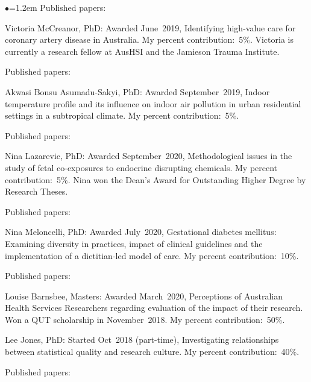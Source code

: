 \documentclass[a4paper,11pt]{article}
\renewcommand{\labelitemi}{$\bullet$}
\begin{document}
\begin{raggedright}
\begin{list}{\labelitemi}{\leftmargin=1.2em}
Published papers: 

\item Victoria McCreanor, PhD: Awarded June~2019, Identifying high-value care for coronary artery disease in Australia. My percent contribution:~5\%. Victoria is currently a research fellow at AusHSI and the Jamieson Trauma Institute.

Published papers: 

\item Akwasi Bonsu Asumadu-Sakyi, PhD: Awarded September~2019, Indoor temperature profile and its influence on indoor air pollution in urban residential settings in a subtropical climate. My percent contribution:~5\%.

Published papers: 

\item Nina Lazarevic, PhD: Awarded September~2020, Methodological issues in the study of fetal co-exposures to endocrine disrupting chemicals. My percent contribution:~5\%. Nina won the Dean’s Award for Outstanding Higher Degree by Research Theses.

Published papers: 

\item Nina Meloncelli, PhD: Awarded July~2020, Gestational diabetes mellitus: Examining diversity in practices, impact of clinical guidelines and the implementation of a dietitian-led model of care. My percent contribution:~10\%.

Published papers: 

\item Louise Barnsbee, Masters: Awarded March~2020, Perceptions of Australian Health Services Researchers regarding evaluation of the impact of their research. Won a QUT scholarship in November~2018. My percent contribution:~50\%.

\item Lee Jones, PhD: Started Oct~2018 (part-time), Investigating relationships between statistical quality and research culture. My percent contribution:~40\%.

Published papers: 


\end{list}
\end{raggedright}
\end{document}
